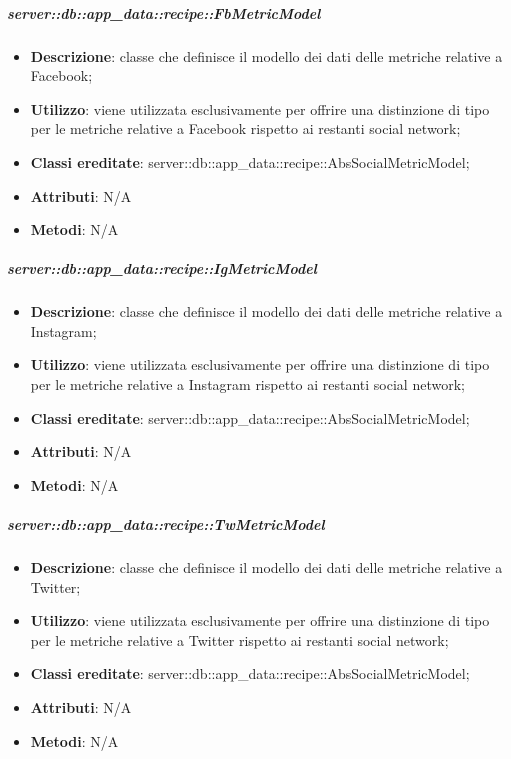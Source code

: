 		\subparagraph{server::db::app\_data::recipe::FbMetricModel} %
		\label{subp:server_db_app_data_recipe_fbmetricmodel}
			\begin{itemize}
				\item \textbf{Descrizione}: classe che definisce il modello dei dati delle metriche relative a Facebook;
				\item \textbf{Utilizzo}: viene utilizzata esclusivamente per offrire una distinzione di tipo per le metriche relative a Facebook rispetto ai restanti social network;
				\item \textbf{Classi ereditate}: server::db::app\_data::recipe::AbsSocialMetricModel;
				\item \textbf{Attributi}: N/A
				\item \textbf{Metodi}: N/A
			\end{itemize}


		\subparagraph{server::db::app\_data::recipe::IgMetricModel} %
		\label{subp:server_db_app_data_recipe_igmetricmodel}
			\begin{itemize}
				\item \textbf{Descrizione}: classe che definisce il modello dei dati delle metriche relative a Instagram;
				\item \textbf{Utilizzo}: viene utilizzata esclusivamente per offrire una distinzione di tipo per le metriche relative a Instagram rispetto ai restanti social network;
				\item \textbf{Classi ereditate}: server::db::app\_data::recipe::AbsSocialMetricModel;
				\item \textbf{Attributi}: N/A
				\item \textbf{Metodi}: N/A
			\end{itemize}


		\subparagraph{server::db::app\_data::recipe::TwMetricModel} %
		\label{subp:server_db_app_data_recipe_twmetricmodel}
			\begin{itemize}
				\item \textbf{Descrizione}: classe che definisce il modello dei dati delle metriche relative a Twitter;
				\item \textbf{Utilizzo}: viene utilizzata esclusivamente per offrire una distinzione di tipo per le metriche relative a Twitter rispetto ai restanti social network;
				\item \textbf{Classi ereditate}: server::db::app\_data::recipe::AbsSocialMetricModel;
				\item \textbf{Attributi}: N/A
				\item \textbf{Metodi}: N/A
			\end{itemize}
